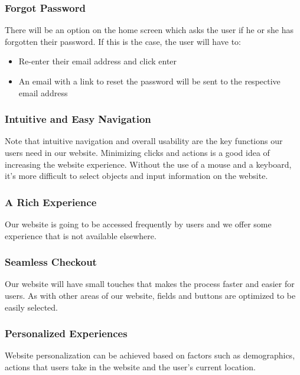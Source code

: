 \documentclass[a4paper, 12pt]{article}
\begin{document}
\subsubsection{Forgot Password}

There will be an option on the home screen which asks the user if he or she has forgotten their password. If this is the case, the user will have to:

\begin{itemize}
\item Re-enter their email address and click enter
\item An email with a link to reset the password will be sent to the respective email address
\end{itemize}

\subsubsection{Intuitive and Easy Navigation}

Note that intuitive navigation and overall usability are the key functions our users need in our website. Minimizing clicks and actions is a good idea of increasing the website experience. Without the use of a mouse and a keyboard, it’s more difficult to select objects and input information on the website. 

\subsubsection{A Rich Experience}

Our website is going to be accessed frequently by users and we offer some experience that is not available elsewhere.

\subsubsection{Seamless Checkout}

Our website will have small touches that makes the process faster and easier for users. As with other areas of our website, fields and buttons are optimized to be easily selected.

\subsubsection{Personalized Experiences}

Website personalization can be achieved based on factors such as demographics, actions that users take in the website and the user’s current location. 
\end{document}
